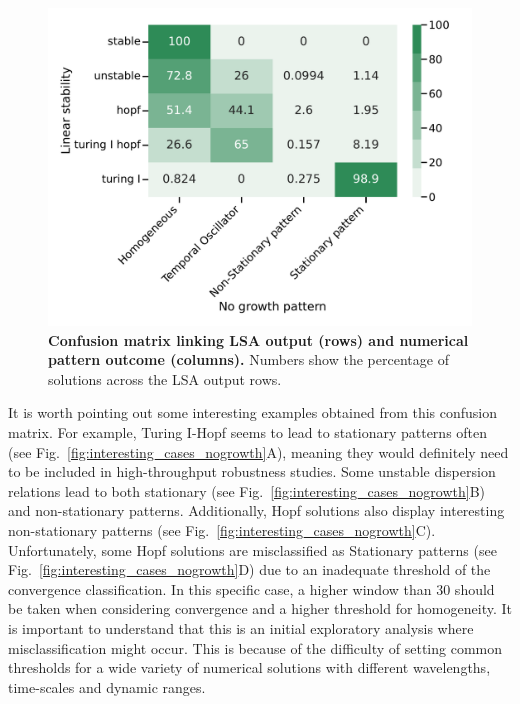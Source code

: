 \begin{figure}[H] %
    \centering
    \includegraphics[width=1\textwidth]{chapters/Chapter 1/lsa_vs_numerical_confusion_variant0-11-12} %
    \caption{\textbf{Confusion matrix linking LSA output (rows) and numerical pattern outcome (columns).} Numbers show the percentage of solutions across the LSA output rows.}
    \label{fig:lsa_numerical_confusion} %
\end{figure}

It is worth pointing out some interesting examples obtained from this confusion matrix.
For example, Turing I-Hopf seems to lead to stationary patterns often (see Fig.~\ref{fig:interesting_cases_nogrowth}A), meaning they would definitely need to be included in high-throughput robustness studies.
Some unstable dispersion relations lead to both stationary (see Fig.~\ref{fig:interesting_cases_nogrowth}B) and non-stationary patterns.
Additionally, Hopf solutions also display interesting non-stationary patterns (see Fig.~\ref{fig:interesting_cases_nogrowth}C).
Unfortunately, some Hopf solutions are misclassified as Stationary patterns (see Fig.~\ref{fig:interesting_cases_nogrowth}D) due to an inadequate threshold of the convergence classification.
In this specific case, a higher window than 30 should be taken when considering convergence and a higher threshold for homogeneity.
It is important to understand that this is an initial exploratory analysis where misclassification might occur.
This is because of the difficulty of setting common thresholds for a wide variety of numerical solutions with different wavelengths, time-scales and dynamic ranges.

